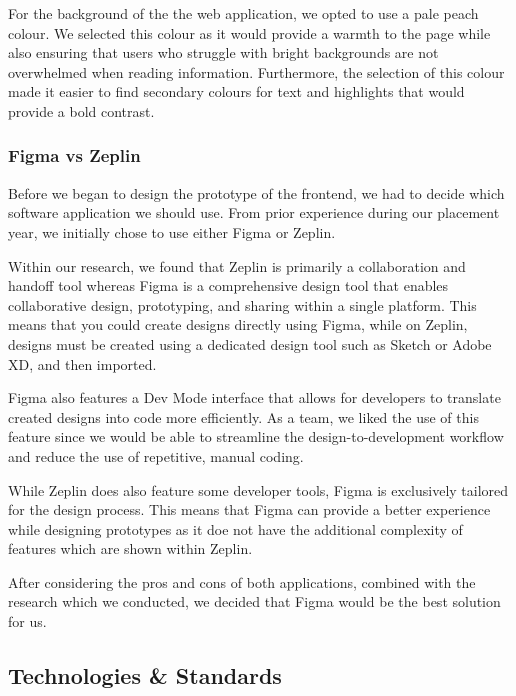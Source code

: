 \documentclass{article}
\begin{document}
For the background of the the web application, we opted to use a pale peach
colour. We selected this colour as it would provide a warmth to the page while
also ensuring that users who struggle with bright backgrounds are not
overwhelmed when reading information. Furthermore, the selection of this colour
made it easier to find secondary colours for text and highlights that would
provide a bold contrast.

\subsubsection{Figma vs Zeplin}
Before we began to design the prototype of the frontend, we had to decide which
software application we should use. From prior experience during our placement
year, we initially chose to use either Figma or Zeplin.

Within our research, we found that Zeplin is primarily a collaboration and
handoff tool whereas Figma is a comprehensive design tool that enables
collaborative design, prototyping, and sharing within a single platform. This
means that you could create designs directly using Figma, while on Zeplin,
designs must be created using a dedicated design tool such as Sketch or Adobe
XD, and then imported.

Figma also features a Dev Mode interface that allows for developers to
translate created designs into code more efficiently. As a team, we liked the
use of this feature since we would be able to streamline the
design-to-development workflow and reduce the use of repetitive, manual coding.

While Zeplin does also feature some developer tools, Figma is exclusively
tailored for the design process. This means that Figma can provide a better
experience while designing prototypes as it doe not have the additional
complexity of features which are shown within Zeplin.

After considering the pros and cons of both applications, combined with the
research which we conducted, we decided that Figma would be the best solution
for us.

\subsection{Technologies & Standards}
\end{document}
